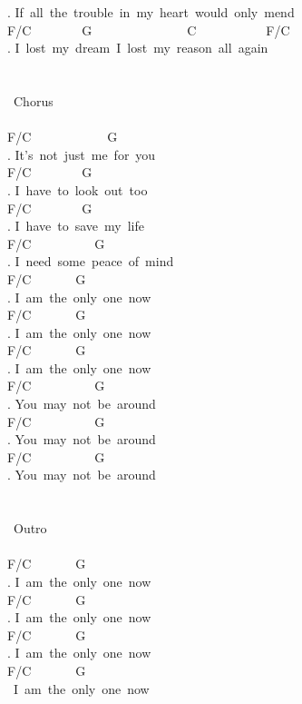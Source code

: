 {. If\ all\ the\ trouble\ in\ my\ heart\ would\ only\ mend\\
F/C\ \ \ \ \ \ \ \ G\ \ \ \ \ \ \ \ \ \ \ \ \ \ \ C\ \ \ \ \ \ \ \ \ \ \ F/C\\
. I\ lost\ my\ dream\ I\ lost\ my\ reason\ all\ again\\
\\
\\
\lbrack\ Chorus\rbrack\\
\\
F/C\ \ \ \ \ \ \ \ \ \ \ \ G\ \ \ \ \ \ \ \ \ \ \\
. It's\ not\ just\ me\ for\ you\ \ \\
F/C\ \ \ \ \ \ \ \ G\\
. I\ have\ to\ look\ out\ too\\
F/C\ \ \ \ \ \ \ \ G\ \ \\
. I\ have\ to\ save\ my\ life\\
F/C\ \ \ \ \ \ \ \ \ \ G\\
. I\ need\ some\ peace\ of\ mind\\
F/C\ \ \ \ \ \ \ G\ \ \ \ \ \ \ \ \ \\
. I\ am\ the\ only\ one\ now\\
F/C\ \ \ \ \ \ \ G\\
. I\ am\ the\ only\ one\ now\\
F/C\ \ \ \ \ \ \ G\\
. I\ am\ the\ only\ one\ now\\
F/C\ \ \ \ \ \ \ \ \ \ G\\
. You\ may\ not\ be\ around\\
F/C\ \ \ \ \ \ \ \ \ \ G\\
. You\ may\ not\ be\ around\\
F/C\ \ \ \ \ \ \ \ \ \ G\\
. You\ may\ not\ be\ around\\
\\
\\
\lbrack\ Outro\rbrack\\
\\
F/C\ \ \ \ \ \ \ G\ \ \ \ \ \ \ \ \ \\
. I\ am\ the\ only\ one\ now\\
F/C\ \ \ \ \ \ \ G\ \ \ \ \ \ \ \ \ \\
. I\ am\ the\ only\ one\ now\\
F/C\ \ \ \ \ \ \ G\ \ \ \ \ \ \ \ \ \\
. I\ am\ the\ only\ one\ now\\
F/C\ \ \ \ \ \ \ G\ \ \ \ \ \ \ \ \ \\
\ I\ am\ the\ only\ one\ now\ }
